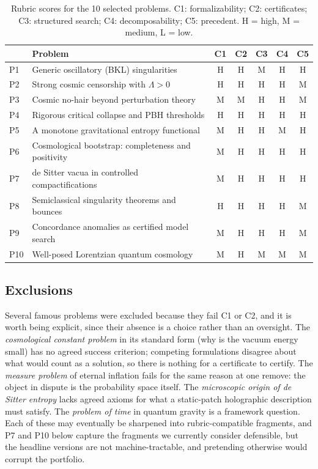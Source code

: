 \documentclass[11pt,letterpaper]{article}
\newcommand{\HH}{H}
\newcommand{\MM}{M}
\newcommand{\LL}{L}
\begin{document}
\begin{table}[t]
\centering
\small
\begin{tabular}{@{}llccccc@{}}
\toprule
 & Problem & C1 & C2 & C3 & C4 & C5 \\
\midrule
P1  & Generic oscillatory (BKL) singularities            & \HH & \HH & \MM & \HH & \HH \\
P2  & Strong cosmic censorship with $\Lambda>0$          & \HH & \HH & \HH & \HH & \MM \\
P3  & Cosmic no-hair beyond perturbation theory          & \MM & \MM & \HH & \HH & \MM \\
P4  & Rigorous critical collapse and PBH thresholds      & \HH & \HH & \HH & \HH & \HH \\
P5  & A monotone gravitational entropy functional        & \MM & \HH & \HH & \MM & \HH \\
P6  & Cosmological bootstrap: completeness and positivity& \MM & \HH & \HH & \HH & \HH \\
P7  & de Sitter vacua in controlled compactifications    & \MM & \HH & \HH & \HH & \HH \\
P8  & Semiclassical singularity theorems and bounces     & \HH & \HH & \HH & \HH & \MM \\
P9  & Concordance anomalies as certified model search    & \MM & \HH & \HH & \HH & \MM \\
P10 & Well-posed Lorentzian quantum cosmology            & \MM & \HH & \MM & \MM & \MM \\
\bottomrule
\end{tabular}
\caption{Rubric scores for the 10 selected problems. C1: formalizability; C2: certificates; C3: structured search; C4: decomposability; C5: precedent. \HH{} = high, \MM{} = medium, \LL{} = low.}
\label{tab:scores}
\end{table}

\subsection{Exclusions}

Several famous problems were excluded because they fail C1 or C2, and it is worth being explicit, since their absence is a choice rather than an oversight. The \emph{cosmological constant problem} in its standard form (why is the vacuum energy small) has no agreed success criterion; competing formulations disagree about what would count as a solution, so there is nothing for a certificate to certify. The \emph{measure problem} of eternal inflation fails for the same reason at one remove: the object in dispute is the probability space itself. The \emph{microscopic origin of de Sitter entropy} \cite{gibbonshawking1977} lacks agreed axioms for what a static-patch holographic description must satisfy. The \emph{problem of time} in quantum gravity is a framework question. Each of these may eventually be sharpened into rubric-compatible fragments, and P7 and P10 below capture the fragments we currently consider defensible, but the headline versions are not machine-tractable, and pretending otherwise would corrupt the portfolio.
\end{document}
